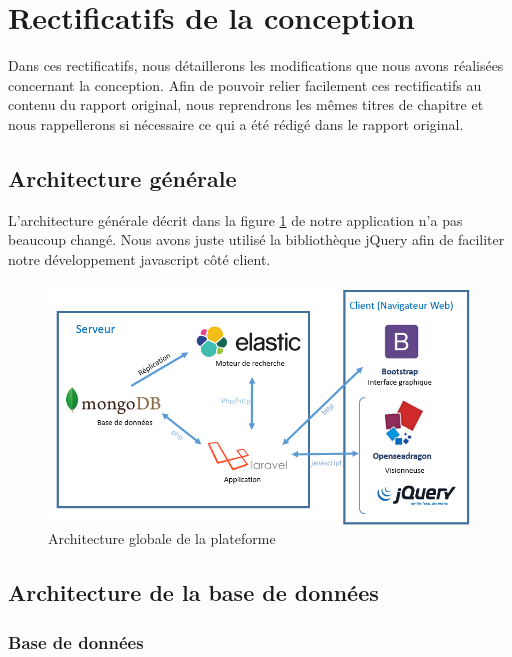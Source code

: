 \section{Rectificatifs de la conception}
\label{sec:majconc}

Dans ces rectificatifs, nous détaillerons les modifications que nous avons réalisées concernant la conception\cite{Conc}. Afin de pouvoir relier facilement ces rectificatifs au contenu du rapport original, nous reprendrons les mêmes titres de chapitre et nous rappellerons si nécessaire ce qui a été rédigé dans le rapport original. 

\subsection{Architecture générale}

L'architecture générale décrit dans la figure \ref{archi} de notre application n'a pas beaucoup changé. Nous avons juste utilisé la bibliothèque jQuery afin de faciliter notre développement javascript côté client.

    \begin{figure}[H]
        \centering
        \includegraphics[width=\textwidth]{figure/Archi.png}
            \caption{Architecture globale de la plateforme}
            \label{archi}
    \end{figure}
		
\subsection{Architecture de la base de données}

\subsubsection{Base de données}

